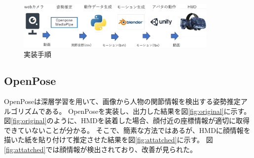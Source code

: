 \begin{figure}[h]
 \centering
 \includegraphics[width=98mm]{./fig/flowchart2.eps}
 \caption{実装手順}
 \label{fig:flowchart}
\end{figure}
\vspace{-1.2mm}
\subsection{OpenPose}
OpenPose\cite{Openpose}は深層学習を用いて、画像から人物の関節情報を検出する姿勢推定アルゴリズムである。
OpenPoseを実装し、出力した結果を図\ref{fig:original}に示す。
図\ref{fig:original}のように、HMDを装着した場合、顔付近の座標情報が適切に取得できていないことが分かる。
そこで、簡素な方法ではあるが、HMDに顔情報を描いた紙を貼り付けて推定させた結果を図\ref{fig:attatched}に示す。
図\ref{fig:attatched}では顔情報が検出されており、改善が見られた。
\vspace{-1.2mm}
